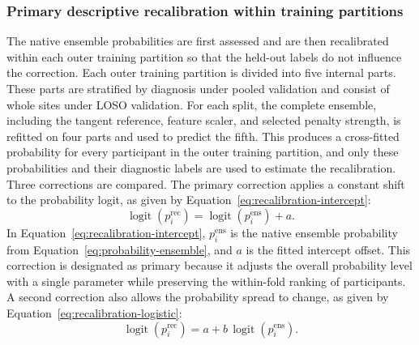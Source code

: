\subsubsection{Primary descriptive recalibration within training partitions}
\label{subsubsec:recalibration}

The native ensemble probabilities are first assessed and are then recalibrated within each outer training partition so that the held-out labels do not influence the correction. Each outer training partition is divided into five internal parts. These parts are stratified by diagnosis under pooled validation and consist of whole sites under LOSO validation. For each split, the complete ensemble, including the tangent reference, feature scaler, and selected penalty strength, is refitted on four parts and used to predict the fifth. This produces a cross-fitted probability for every participant in the outer training partition, and only these probabilities and their diagnostic labels are used to estimate the recalibration. Three corrections are compared. The primary correction applies a constant shift to the probability logit, as given by Equation~\eqref{eq:recalibration-intercept}:
\begin{equation}
\operatorname{logit}\!\left(p_i^{\mathrm{rec}}\right)
=
\operatorname{logit}\!\left(p_i^{\mathrm{ens}}\right) + a .
\label{eq:recalibration-intercept}
\end{equation}
In Equation~\eqref{eq:recalibration-intercept}, $p_i^{\mathrm{ens}}$ is the native ensemble probability from Equation~\eqref{eq:probability-ensemble}, and $a$ is the fitted intercept offset. This correction is designated as primary because it adjusts the overall probability level with a single parameter while preserving the within-fold ranking of participants. A second correction also allows the probability spread to change, as given by Equation~\eqref{eq:recalibration-logistic}:
\begin{equation}
\operatorname{logit}\!\left(p_i^{\mathrm{rec}}\right)
=
a + b\,\operatorname{logit}\!\left(p_i^{\mathrm{ens}}\right).
\label{eq:recalibration-logistic}
\end{equation}
